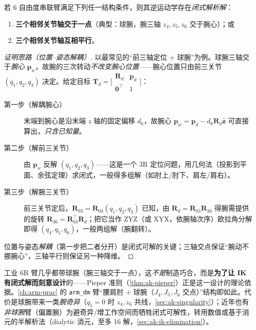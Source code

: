 \begin{theorem}\label{thm:ak-pieper}
若 6 自由度串联臂满足下列任一结构条件，则其逆运动学存在\emph{闭式解析解}\cite{spong2006robot}：
\begin{enumerate}
  \item \textbf{三个相邻关节轴交于一点}（典型：球腕，腕三轴 $z_4,z_5,z_6$ 交于腕心）；或
  \item \textbf{三个相邻关节轴互相平行}。
\end{enumerate}
\end{theorem}
\begin{proof}[证明思路（位置--姿态解耦）]
以最常见的“前三轴定位 + 球腕”为例\cite{spong2006robot}。球腕三轴交于\emph{腕心} $\mathbf{p}_w$，故腕的三次转动\emph{不改变腕心位置}——腕心位置只由前三关节 $(q_1,q_2,q_3)$ 决定。给定目标 $\mathbf{T}_d=\big[\begin{smallmatrix}\mathbf{R}_d&\mathbf{p}_d\\\mathbf{0}^\top&1\end{smallmatrix}\big]$：
\begin{description}
  \item[第一步（解耦腕心）] 末端到腕心是沿末端 $z$ 轴的固定偏移 $d_6$，故腕心 $\mathbf{p}_w=\mathbf{p}_d-d_6\mathbf{R}_d\hat{\mathbf{z}}$ 可直接算出，\emph{只含已知量}。
  \item[第二步（解前三关节）] 由 $\mathbf{p}_w$ 反解 $(q_1,q_2,q_3)$——这是一个 3R 定位问题，用几何法（投影到平面、余弦定理）求闭式，一般得多组解（如肘上/肘下、肩左/肩右）。
  \item[第三步（解腕三关节）] 前三关节定后，$\mathbf{R}_{03}=\mathbf{R}_{03}(q_1,q_2,q_3)$ 已知，由 $\mathbf{R}_d=\mathbf{R}_{03}\mathbf{R}_{36}$ 得腕需提供的旋转 $\mathbf{R}_{36}=\mathbf{R}_{03}^\top\mathbf{R}_d$；把它当作 ZYZ（或 XYX，依腕轴次序）欧拉角分解即得 $(q_4,q_5,q_6)$，一般两组解（腕翻转）。
\end{description}
位置与姿态\emph{解耦}（第一步把二者分开）是闭式可解的关键；三轴交点保证“腕动不挪腕心”，三轴平行则保证另一种降维。
\end{proof}

\begin{insight}
工业 6R 臂几乎都带球腕（腕三轴交于一点），这\emph{不是}制造巧合，而是\textbf{为了让 IK 有闭式解而刻意设计}的——Pieper 准则（\cref{thm:ak-pieper}）正是这一设计的理论依据。\cref{ch:arm-prac} 的 \texttt{arm\_dm} 臂“腰肩肘 + 球腕（$J_4,J_5,J_6$ 交点）”结构即如此。代价是球腕带来一类\emph{腕奇异}（$q_5=0$ 时 $z_4,z_6$ 共线，\cref{sec:ak-singularity}）；近年也有\emph{非球腕}臂（偏置腕）为避奇异/增工作空间而牺牲闭式可解性，转用数值或基于消元的半解析法（dialytic 消元，至多 16 解，\cref{sec:ak-ik-elimination}）。
\end{insight}

